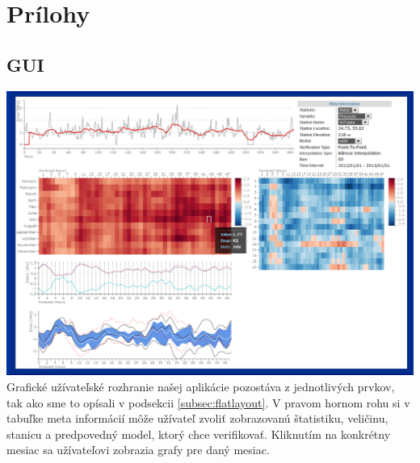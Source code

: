 \appendix
\chapter{Prílohy}

\section{GUI}
{ \hspace*{-0.3in}
\includegraphics[width=7in]{gui} 
}
Grafické užívateľské rozhranie našej aplikácie pozostáva z jednotlivých prvkov, tak ako sme to opísali v podsekcii \ref{subsec:flatlayout}. V pravom hornom rohu si v tabuľke meta informácií môže užívateľ zvoliť zobrazovanú štatistiku, veličinu, stanicu a predpovedný model, ktorý chce verifikovať. Kliknutím na konkrétny mesiac sa užívateľovi zobrazia grafy pre daný mesiac.

